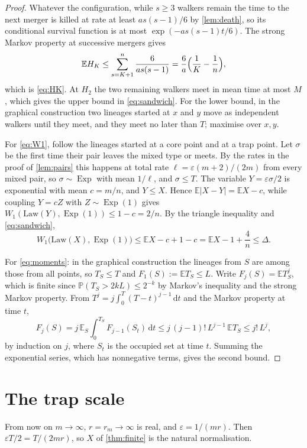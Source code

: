 \documentclass[11pt,a4paper]{article}
\numberwithin{equation}{section}
\theoremstyle{remark}
\newcommand{\E}{\mathbb E}
\newcommand{\Pp}{\mathbb P}
\newcommand{\dd}{\,\mathrm d}
\newcommand{\eps}{\varepsilon}
\newcommand{\Exp}{\operatorname{Exp}}
\newcommand{\abs}[1]{\lvert#1\rvert}
\begin{document}
\begin{proof}
Whatever the configuration, while $s\ge3$ walkers remain the time to the next merger is killed at rate at least $as(s-1)/6$ by \cref{lem:death}, so its conditional survival function is at most $\exp(-as(s-1)t/6)$. The strong Markov property at successive mergers gives
\[
\E H_K\le\sum_{s=K+1}^n\frac6{as(s-1)}=\frac6a\Bigl(\frac1K-\frac1n\Bigr),
\]
which is \eqref{eq:HK}. At $H_2$ the two remaining walkers meet in mean time at most $M$, which gives the upper bound in \eqref{eq:sandwich}. For the lower bound, in the graphical construction two lineages started at $x$ and $y$ move as independent walkers until they meet, and they meet no later than $T$; maximise over $x,y$.

For \eqref{eq:W1}, follow the lineages started at a core point and at a trap point. Let $\sigma$ be the first time their pair leaves the mixed type or meets. By the rates in the proof of \cref{lem:pairs} this happens at total rate $\ell=\eps(m+2)/(2m)$ from every mixed pair, so $\sigma\sim\Exp$ with mean $1/\ell$, and $\sigma\le T$. The variable $Y=\eps\sigma/2$ is exponential with mean $c=m/n$, and $Y\le X$. Hence $\E\abs{X-Y}=\E X-c$, while coupling $Y=cZ$ with $Z\sim\Exp(1)$ gives $W_1(\mathrm{Law}(Y),\Exp(1))\le1-c=2/n$. By the triangle inequality and \eqref{eq:sandwich},
\[
W_1\bigl(\mathrm{Law}(X),\Exp(1)\bigr)\le\E X-c+1-c=\E X-1+\frac4n\le\Delta .
\]

For \eqref{eq:moments}: in the graphical construction the lineages from $S$ are among those from all points, so $T_S\le T$ and $F_1(S):=\E T_S\le L$. Write $F_j(S)=\E T_S^j$, which is finite since $\Pp(T_S>2kL)\le2^{-k}$ by Markov's inequality and the strong Markov property. From $T^j=j\int_0^T(T-t)^{j-1}\dd t$ and the Markov property at time $t$,
\[
F_j(S)=j\,\E_S\int_0^{T_S}F_{j-1}(S_t)\dd t\le j\,(j-1)!\,L^{j-1}\,\E T_S\le j!\,L^j ,
\]
by induction on $j$, where $S_t$ is the occupied set at time $t$. Summing the exponential series, which has nonnegative terms, gives the second bound.
\end{proof}

\section{The trap scale}\label{sec:scale}

From now on $m\to\infty$, $r=r_m\to\infty$ is real, and $\eps=1/(mr)$. Then $\eps T/2=T/(2mr)$, so $X$ of \cref{thm:finite} is the natural normalisation.
\end{document}
